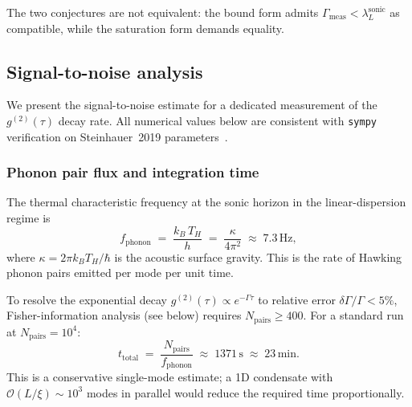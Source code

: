 \documentclass[12pt,a4paper]{article}
\begin{document}
\noindent The two conjectures are not equivalent: the bound form
admits $\Gamma_{\mathrm{meas}} < \lambda_L^{\mathrm{sonic}}$ as
compatible, while the saturation form demands equality.

\subsection{Signal-to-noise analysis}
\label{ssec:bec-sn}

We present the signal-to-noise estimate for a dedicated measurement
of the $g^{(2)}(\tau)$ decay rate.  All numerical values below are
consistent with \texttt{sympy} verification on Steinhauer~2019
parameters~\cite{Steinhauer2019}.

\subsubsection{Phonon pair flux and integration time}

The thermal characteristic frequency at the sonic horizon in the
linear-dispersion regime is
\begin{equation}
  f_{\mathrm{phonon}} \;=\; \frac{k_B\,T_H}{h}
    \;=\; \frac{\kappa}{4\pi^2}
    \;\approx\; 7.3\,\mathrm{Hz},
\end{equation}
where $\kappa = 2\pi k_B T_H/\hbar$ is the acoustic surface gravity.
This is the rate of Hawking phonon pairs emitted per mode per unit time.

To resolve the exponential decay $g^{(2)}(\tau) \propto
e^{-\Gamma\tau}$ to relative error $\delta\Gamma/\Gamma < 5\%$,
Fisher-information analysis (see below) requires $N_{\mathrm{pairs}}
\ge 400$.  For a standard run at $N_{\mathrm{pairs}} = 10^4$:
\begin{equation}
  t_{\mathrm{total}} \;=\; \frac{N_{\mathrm{pairs}}}{f_{\mathrm{phonon}}}
    \;\approx\; 1371\,\mathrm{s} \;\approx\; 23\,\mathrm{min}.
  \label{eq:bec-ttotal}
\end{equation}
This is a conservative single-mode estimate; a 1D condensate with
$\mathcal{O}(L/\xi) \sim 10^3$ modes in parallel would reduce the
required time proportionally.
\end{document}
